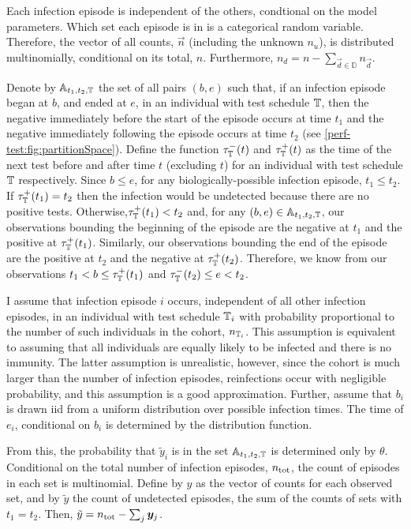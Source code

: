 \documentclass[thesis.tex]{subfiles}
\begin{document}
Each infection episode is independent of the others, condtional on the model parameters.
Which set each episode is in is a categorical random variable.
Therefore, the vector of all counts, $\vec{n}$ (including the unknown $n_u$), is distributed multinomially, conditional on its total, $n$.
Furthermore, $n_d = n - \sum_{\vec{d} \in \mathbb{D}} n_{\vec{d}}$.

Denote by $\mathbb{A}_{t_1,t_2,\mathbb{T}}$ the set of all pairs $(b, e)$ such that, if an infection episode began at $b$, and ended at $e$, in an individual with test schedule $\mathbb{T}$, then the negative immediately before the start of the episode occurs at time $t_1$ and the negative immediately following the episode occurs at time $t_2$ (see \cref{perf-test:fig:partitionSpace}).
Define the function $\tau^-_{\mathbb{T}}(t)$ and $\tau^+_{\mathbb{T}}(t)$ as the time of the next test before and after time $t$ (excluding $t$) for an individual with test schedule $\mathbb{T}$ respectively.
Since $b \leq e$, for any biologically-possible infection episode, $t_1 \leq t_2$.
If $\tau^+_{\mathbb{T}}(t_1) = t_2$ then the infection would be undetected because there are no positive tests.
Otherwise,$\tau^+_{\mathbb{T}}(t_1) < t_2$ and, for any $(b, e) \in \mathbb{A}_{t_1,t_2,\mathbb{T}}$, our observations bounding the beginning of the episode are the negative at $t_1$ and the positive at $\tau^+_{\mathbb{T}}(t_1)$.
Similarly, our observations bounding the end of the episode are the positive at $t_2$ and the negative at $\tau^+_{\mathbb{T}}(t_2)$.
Therefore, we know from our observations $t_1 < b \leq \tau^+_{\mathbb{T}}(t_1)$ and $\tau^-_{\mathbb{T}}(t_2) \leq e < t_2$.

I assume that infection episode $i$ occurs, independent of all other infection episodes, in an individual with test schedule $\mathbb{T}_i$ with probability proportional to the number of such individuals in the cohort, $n_{\mathbb{T}_i}$.
This assumption is equivalent to assuming that all individuals are equally likely to be infected and there is no immunity.
The latter assumption is unrealistic, however, since the cohort is much larger than the number of infection episodes, reinfections occur with negligible probability, and this assumption is a good approximation.
Further, assume that $b_i$ is drawn iid from a uniform distribution over possible infection times.
The time of $e_i$, conditional on $b_i$ is determined by the distribution function.

From this, the probability that $\tilde{y}_i$ is in the set $\mathbb{A}_{t_1,t_2,\mathbb{T}}$ is determined only by $\theta$.
Conditional on the total number of infection episodes, $n_\text{tot}$, the count of episodes in each set is multinomial.
Define by $y$ as the vector of counts for each observed set, and by $\tilde{y}$ the count of undetected episodes, \ie the sum of the counts of sets with $t_1 = t_2$.
Then, $\tilde{y} = n_\text{tot} - \sum_j \bm{y}_j$.
\end{document}
